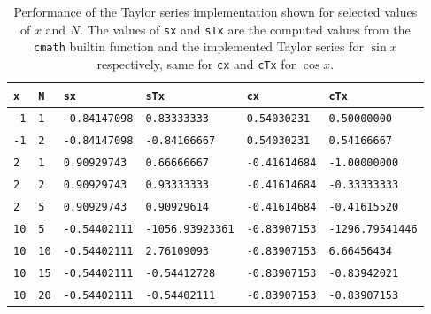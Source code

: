 \documentclass[a4paper,10pt]{article}
\begin{document}
\begin{table}[!ht]
\centering 
  \begin{minipage}[t]{105mm}
    \caption{
      Performance of the Taylor series implementation shown for selected values of 
      $x$ and $N$. The values of \texttt{sx} and \texttt{sTx} are the computed values
      from the \texttt{cmath} builtin function and the implemented Taylor series for $\sin x$
      respectively,
      same for \texttt{cx} and \texttt{cTx} for $\cos x$.
    } 
    \label{TABtask1}
  \end{minipage}

  \vspace{5mm}
  \begin{tabular}{l l l l l l} 
    \texttt{x}&\texttt{N}&\texttt{sx} & \texttt{sTx} & \texttt{cx} & \texttt{cTx} \\
    \hline
    \texttt{-1}	& \texttt{1}	
    & \texttt{-0.84147098} & \texttt{0.83333333} & \texttt{0.54030231} & \texttt{0.50000000}	\\
    \texttt{-1}	& \texttt{2}	
    & \texttt{-0.84147098} & \texttt{-0.84166667} & \texttt{0.54030231} & \texttt{0.54166667}	\\
    \hline
    \texttt{2}	& \texttt{1}	
    & \texttt{0.90929743} & \texttt{0.66666667} & \texttt{-0.41614684} & \texttt{-1.00000000}	\\
    \texttt{2}	& \texttt{2}	
    & \texttt{0.90929743} & \texttt{0.93333333} & \texttt{-0.41614684} & \texttt{-0.33333333}	\\
    \texttt{2}	& \texttt{5}	
    & \texttt{0.90929743} & \texttt{0.90929614} & \texttt{-0.41614684} & \texttt{-0.41615520}	\\
    \hline
    \texttt{10}	& \texttt{5}	
    & \texttt{-0.54402111} & \texttt{-1056.93923361} &\texttt{-0.83907153}&\texttt{-1296.79541446}\\
    \texttt{10}	& \texttt{10}	
    & \texttt{-0.54402111} & \texttt{2.76109093} & \texttt{-0.83907153} & \texttt{6.66456434}	\\
     \texttt{10}	& \texttt{15}	
    & \texttt{-0.54402111} & \texttt{-0.54412728} & \texttt{-0.83907153} & \texttt{-0.83942021}	\\
     \texttt{10}	& \texttt{20}	
    & \texttt{-0.54402111} & \texttt{-0.54402111} & \texttt{-0.83907153} & \texttt{-0.83907153}	\\
 
 

  \end{tabular}
\end{table}
\end{document}
